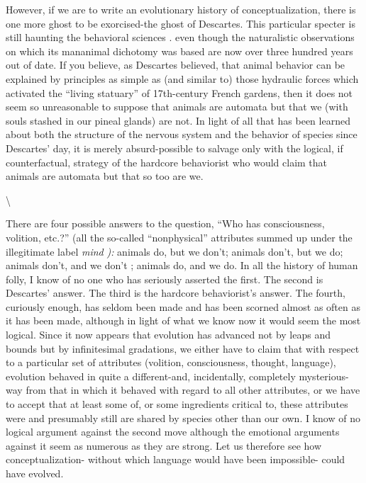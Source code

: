 However, if we are to write an evolutionary history of con\-ceptualization, there is one more ghost to be exorcised-the ghost of Descartes. This particular specter is still haunting the behavioral sci\-ences . even though the naturalistic observations on which its man\-animal dichotomy was based are now over three hundred years out of date. If you believe, as Descartes believed, that animal behavior can be explained by principles as simple as (and similar to) those hydraulic forces which activated the ``living statuary'' of 17th-century French gardens, then it does not seem so unreasonable to suppose that animals are automata but that we (with souls stashed in our pineal glands) are not. In light of all that has been learned about both the structure of the nervous system and the behavior of species since Descartes' day, it is merely absurd-possible to salvage only with the logical, if counter\-factual, strategy of the hardcore behaviorist who would claim that animals are automata but that so too are we.

{\textbackslash}


There are four possible answers to the question, ``Who has con\-sciousness, volition, etc.?'' (all the so-called ``nonphysical'' attributes summed up under the illegitimate label \textit{mind} \textit{):} animals do, but we don't; animals don't, but we do; animals don't, and we don't ; animals do, and we do. In all the history of human folly, I know of no one who has seriously asserted the first. The second is Descartes' answer. The third is the hardcore behaviorist's answer. The fourth, curiously enough, has seldom been made and has been scorned almost as often as it has been made, although in light of what we know now it would seem the most logical. Since it now appears that evolution has ad\-vanced not by leaps and bounds but by infinitesimal gradations, we either have to claim that with respect to a particular set of attributes (volition, consciousness, thought, language), evolution behaved in quite a different-and, incidentally, completely mysterious-way from that in which it behaved with regard to all other attributes, or we have to accept that at least some of, or some ingredients critical to, these attributes were and presumably still are shared by species other than our own. I know of no logical argument against the second move although the emotional arguments against it seem as numerous as they are strong. Let us therefore see how conceptualization- without which language would have been impossible- could have evolved.

